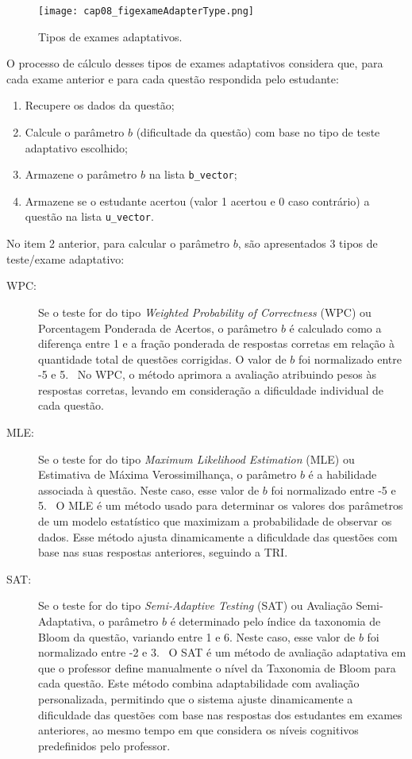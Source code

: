 \begin{figure}[!ht]
  \centering
  \texttt{[image: cap08\_figexameAdapterType.png]}
   \caption{Tipos de exames adaptativos.}
\label{fig:cap08_figexameAdapterType}
\end{figure}

O processo de cálculo desses tipos de exames adaptativos considera que, para cada exame anterior e para cada questão respondida pelo estudante:

\begin{enumerate}
    \item Recupere os dados da questão;
    \item Calcule o parâmetro $b$ (dificultade da questão) com base no tipo de teste adaptativo escolhido;
    \item Armazene o parâmetro $b$ na lista \verb|b_vector|;
    \item Armazene se o estudante acertou (valor 1 acertou e 0 caso contrário) a questão na lista \verb|u_vector|.
\end{enumerate}

No item 2 anterior, para calcular o parâmetro $b$, são apresentados 3 tipos de teste/exame adaptativo:

\begin{description}
  \item[WPC:] Se o teste for do tipo \textit{Weighted Probability of Correctness} (WPC) ou Porcentagem Ponderada de Acertos, o parâmetro $b$ é calculado como a diferença entre 1 e a fração ponderada de respostas corretas em relação à quantidade total de questões corrigidas. O valor de $b$ foi normalizado entre -5 e 5.
  \
  No WPC, o método aprimora a avaliação atribuindo pesos às respostas corretas, levando em consideração a dificuldade individual de cada questão. 
  
  \item[MLE:] Se o teste for do tipo \textit{Maximum Likelihood Estimation} (MLE) ou Estimativa de Máxima Verossimilhança, o parâmetro $b$ é a habilidade associada à questão. Neste caso, esse valor de $b$ foi normalizado entre -5 e 5.
  \
  O MLE é um método usado para determinar os valores dos parâmetros de um modelo estatístico que maximizam a probabilidade de observar os dados. Esse método ajusta dinamicamente a dificuldade das questões com base nas suas respostas anteriores, seguindo a TRI.
  
  \item[SAT:] Se o teste for do tipo \textit{Semi-Adaptive Testing} (SAT) ou Avaliação Semi-Adaptativa, o parâmetro $b$ é determinado pelo índice da taxonomia de Bloom da questão, variando entre 1 e 6. Neste caso, esse valor de $b$ foi normalizado entre -2 e 3.
  \
  O SAT é um método de avaliação adaptativa em que o professor define manualmente o nível da Taxonomia de Bloom para cada questão. Este método combina adaptabilidade com avaliação personalizada, permitindo que o sistema ajuste dinamicamente a dificuldade das questões com base nas respostas dos estudantes em exames anteriores, ao mesmo tempo em que considera os níveis cognitivos predefinidos pelo professor.
\end{description}

